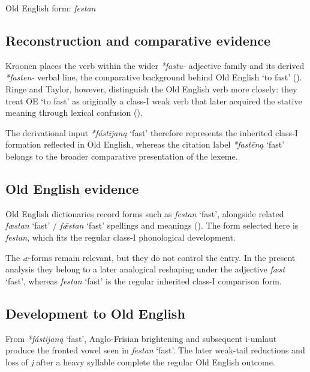 \documentclass[
  british,
  a4paper,
  openany]{book}
\providecommand{\Recon}[1]{\emph{*#1}}
{\catcode`→=\active \global\def→{\ensuremath{\rightarrow}}}
\providecommand{\Recon}[1]{\emph{*#1}}
{\catcode`→=\active \global\def→{\ensuremath{\rightarrow}}}
\begin{document}
Old English form: \emph{festan}

\subsection{Reconstruction and comparative
evidence}\label{reconstruction-and-comparative-evidence-79}

Kroonen places the verb within the wider {\emph{*fastu-}} adjective
family and its derived {\emph{*fasten-}} verbal line, the comparative
background behind Old English `to fast'
(). Ringe and Taylor,
however, distinguish the Old English verb more closely: they treat OE
`to fast' as originally a class-I weak verb that later acquired the
stative meaning through lexical confusion
().

The derivational input {\Recon{fástijaną} `fast'} therefore represents
the inherited class-I formation reflected in Old English, whereas the
citation label {\Recon{fastēną} `fast'} belongs to the broader
comparative presentation of the lexeme.

\subsection{Old English evidence}\label{old-english-evidence-79}

Old English dictionaries record forms such as {\emph{festan}} `fast',
alongside related {\emph{fæstan}} `fast' / {\emph{fǣstan}} `fast'
spellings and meanings (). The form selected here is {\emph{festan}}, which
fits the regular class-I phonological development.

The \emph{æ}-forms remain relevant, but they do not control the entry.
In the present analysis they belong to a later analogical reshaping
under the adjective {\emph{fæst}} `fast', whereas {\emph{festan}} `fast'
is the regular inherited class-I comparison form.

\subsection{Development to Old
English}\label{development-to-old-english-79}

From {\Recon{fástijaną} `fast'}, Anglo-Frisian brightening and
subsequent i-umlaut produce the fronted vowel seen in {\emph{festan}}
`fast'. The later weak-tail reductions and loss of \emph{j} after a
heavy syllable complete the regular Old English outcome.
\end{document}
